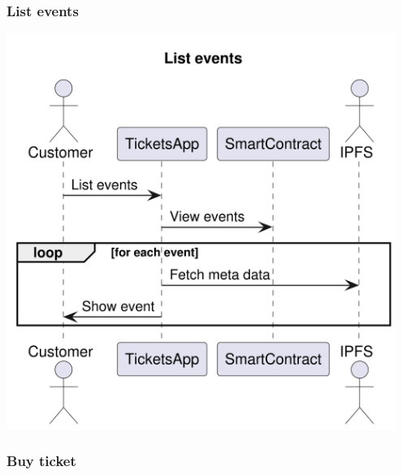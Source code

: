 \documentclass[11pt]{article}
\begin{document}
\subsubsection{List events}
\label{sec:org3fb6b97}

\begin{center}
\includegraphics[width=0.95\textwidth]{./img/list-events.png}
\label{orgc038a26}
\end{center}
\subsubsection{Buy ticket}
\label{sec:org9777165}
\end{document}
